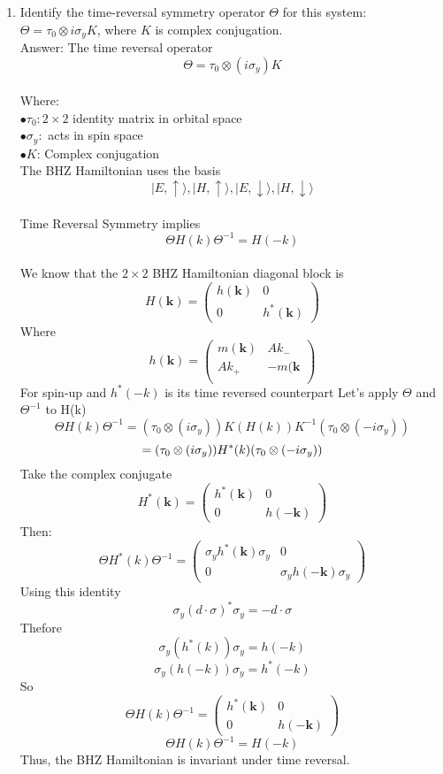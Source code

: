 \documentclass[a4paper,12pt]{article}
\begin{document}
\begin{enumerate}
    \item Identify the time-reversal symmetry operator $\Theta$ for this system: $\Theta = \tau_0 \otimes i\sigma_y K$, where $K$ is complex conjugation.\\
Answer: The time reversal operator\\
\[
\Theta = \tau_0\otimes({i\sigma_y})K
\]\\
Where:\\
$\bullet \tau_0: 2\times2$ identity matrix in orbital space\\
$\bullet \sigma_y:$ acts in spin space\\
$\bullet{K}$: Complex conjugation\\
The BHZ Hamiltonian uses the basis\\
\[\vert E, \uparrow \rangle, \vert H, \uparrow \rangle, \vert E, \downarrow \rangle, \vert H, \downarrow \rangle\]\\
Time Reversal Symmetry implies
\[\Theta H({k})\Theta^{-1} = H({-k})
\]\\
We know that the $2\times2$ BHZ Hamiltonian diagonal block is\\
\[ H(\mathbf{k}) = \begin{pmatrix}
h(\mathbf{k}) & 0\\
0 & h^\ast(\mathbf{k})
\end{pmatrix}\]
Where\\
\[ h(\mathbf{k}) = \begin{pmatrix}
 m(\mathbf{k}) & A k_- \\
 A k_+ & -m(\mathbf{k} \\
\end{pmatrix}\]
For spin-up and $h^{\ast}(-k)$ is its time reversed counterpart
Let's apply $\Theta$ and $\Theta^{-1}$ to H(k)\\
\[ \Theta H(k)\Theta^{-1} = (\tau_0\otimes({i\sigma_y}))K (H(k)) K^{-1} (\tau_0\otimes(-{i\sigma_y}) )
\]
\[= (\tau_0\otimes({i\sigma_y})) H^{\ast}(k) (\tau_0\otimes(-{i\sigma_y}))\\ \]
Take the complex conjugate\\
\[ H^{\ast}(\mathbf{k}) = \begin{pmatrix}
h^{\ast}(\mathbf{k}) & 0\\
0 & h(-\mathbf{k})
\end{pmatrix}\]
Then:\\
\[\Theta H^{\ast}(k)\Theta^{-1} = \begin{pmatrix}
\sigma_{y} h^{\ast}(\mathbf{k}) \sigma_{y} & 0\\
0 & \sigma_{y }h(-\mathbf{k}) \sigma_{y}
\end{pmatrix}\]
Using this identity\\
\[\sigma_{y}( d \cdot \sigma)^{\ast} \sigma_{y} = - d \cdot \sigma
\]
Thefore\\
\[\sigma_{y}( h^{\ast}(k)) \sigma_{y} = h(-k)
\]
\[\sigma_{y}( h(-k)) \sigma_{y} = h^{\ast}(-k)
\]So\\
\[ \Theta H(k)\Theta^{-1} = \begin{pmatrix}
h^{\ast}(\mathbf{k}) & 0\\
0 & h(-\mathbf{k})
\end{pmatrix}\]
\[\Theta H(k)\Theta^{-1}= H(-k)\]
Thus, the BHZ Hamiltonian is invariant under time reversal.


\end{enumerate}
\end{document}
